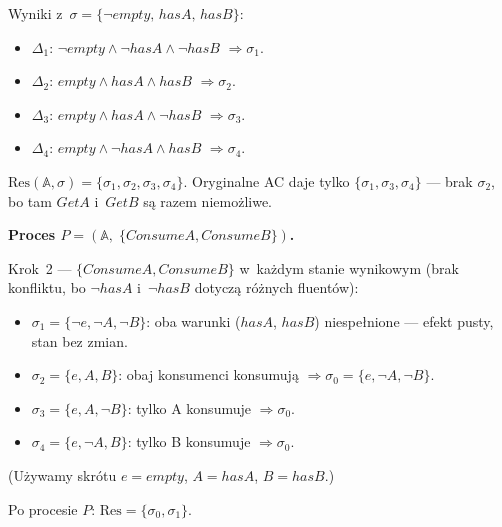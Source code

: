 \documentclass[11pt,a4paper]{article}
\newif\ifshowbib
\newcommand{\bibonly}[1]{\ifshowbib#1\fi}
\renewcommand{\cite}[2][]{\unskip}%
\theoremstyle{definition}
\begin{document}
\noindent Wyniki z~$\sigma = \{\neg\mathit{empty},\, \mathit{hasA},\, \mathit{hasB}\}$:
\begin{itemize}
  \item $\Delta_1$: $\neg\mathit{empty} \land \neg\mathit{hasA} \land \neg\mathit{hasB}$
        $\Rightarrow \sigma_1$.
  \item $\Delta_2$: $\mathit{empty} \land \mathit{hasA} \land \mathit{hasB}$
        $\Rightarrow \sigma_2$.
  \item $\Delta_3$: $\mathit{empty} \land \mathit{hasA} \land \neg\mathit{hasB}$
        $\Rightarrow \sigma_3$.
  \item $\Delta_4$: $\mathit{empty} \land \neg\mathit{hasA} \land \mathit{hasB}$
        $\Rightarrow \sigma_4$.
\end{itemize}

$\mathrm{Res}(\mathbb{A}, \sigma) = \{\sigma_1, \sigma_2, \sigma_3, \sigma_4\}$.
Oryginalne AC\bibonly{~\cite{rw05}} daje tylko $\{\sigma_1, \sigma_3, \sigma_4\}$ --- brak $\sigma_2$,
bo tam $\mathit{GetA}$ i~$\mathit{GetB}$ są razem niemożliwe.

\medskip
\noindent\textbf{Proces $P = (\mathbb{A},\; \{\mathit{ConsumeA}, \mathit{ConsumeB}\})$.}

Krok~2 --- $\{\mathit{ConsumeA}, \mathit{ConsumeB}\}$ w~każdym stanie
wynikowym (brak konfliktu, bo $\neg\mathit{hasA}$ i~$\neg\mathit{hasB}$
dotyczą różnych fluentów):
\begin{itemize}
  \item $\sigma_1 = \{\neg e, \neg A, \neg B\}$:
        oba warunki ($\mathit{hasA}$, $\mathit{hasB}$) niespełnione
        --- efekt pusty, stan bez zmian.
  \item $\sigma_2 = \{e, A, B\}$: obaj konsumenci konsumują
        $\Rightarrow \sigma_0 = \{e, \neg A, \neg B\}$.
  \item $\sigma_3 = \{e, A, \neg B\}$: tylko A konsumuje
        $\Rightarrow \sigma_0$.
  \item $\sigma_4 = \{e, \neg A, B\}$: tylko B konsumuje
        $\Rightarrow \sigma_0$.
\end{itemize}

(Używamy skrótu $e = \mathit{empty}$, $A = \mathit{hasA}$, $B = \mathit{hasB}$.)

Po procesie $P$: $\mathrm{Res} = \{\sigma_0, \sigma_1\}$.
\end{document}
